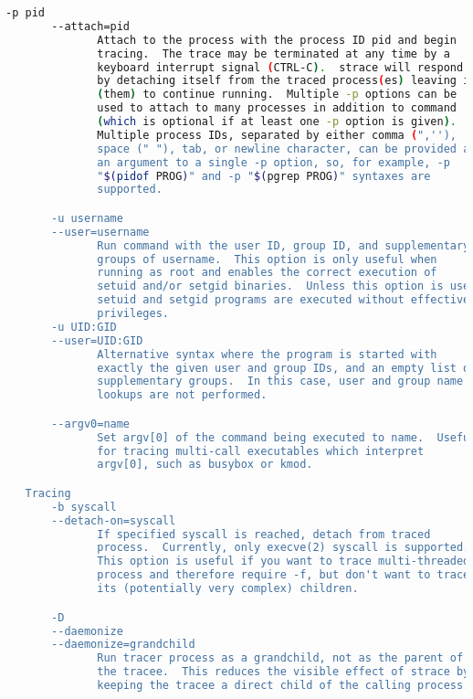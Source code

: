 {{\begin{lstlisting}[language=bash]
       -p pid
       --attach=pid
              Attach to the process with the process ID pid and begin
              tracing.  The trace may be terminated at any time by a
              keyboard interrupt signal (CTRL-C).  strace will respond
              by detaching itself from the traced process(es) leaving it
              (them) to continue running.  Multiple -p options can be
              used to attach to many processes in addition to command
              (which is optional if at least one -p option is given).
              Multiple process IDs, separated by either comma (",''),
              space (" "), tab, or newline character, can be provided as
              an argument to a single -p option, so, for example, -p
              "$(pidof PROG)" and -p "$(pgrep PROG)" syntaxes are
              supported.

       -u username
       --user=username
              Run command with the user ID, group ID, and supplementary
              groups of username.  This option is only useful when
              running as root and enables the correct execution of
              setuid and/or setgid binaries.  Unless this option is used
              setuid and setgid programs are executed without effective
              privileges.
       -u UID:GID
       --user=UID:GID
              Alternative syntax where the program is started with
              exactly the given user and group IDs, and an empty list of
              supplementary groups.  In this case, user and group name
              lookups are not performed.

       --argv0=name
              Set argv[0] of the command being executed to name.  Useful
              for tracing multi-call executables which interpret
              argv[0], such as busybox or kmod.

   Tracing
       -b syscall
       --detach-on=syscall
              If specified syscall is reached, detach from traced
              process.  Currently, only execve(2) syscall is supported.
              This option is useful if you want to trace multi-threaded
              process and therefore require -f, but don't want to trace
              its (potentially very complex) children.

       -D
       --daemonize
       --daemonize=grandchild
              Run tracer process as a grandchild, not as the parent of
              the tracee.  This reduces the visible effect of strace by
              keeping the tracee a direct child of the calling process.


\end{lstlisting}}}
